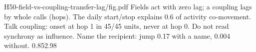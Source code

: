 {H50-field-vs-coupling-transfer-lag/fig.pdf}
{Fields act with zero lag; a coupling lags by whole calls (hops).}
{The daily start/stop explains 0.6 of activity co-movement. Talk coupling: onset at hop 1 in 45/45 units, never at hop 0.}
{Do not read synchrony as influence. Name the recipient: jump 0.17 with a name, 0.004 without.}
{0.85}{2.98}
